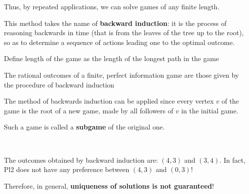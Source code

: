 \documentclass[../main.tex]{subfiles}
\begin{document}
Thus, by repeated applications, we can solve games of any finite length.

This method takes the name of \textbf{backward induction}: it is the process of reasoning backwards in time (that is from the leaves of the tree up to the root), so as to determine a sequence of actions leading one to the optimal outcome.

\begin{definition}
    Define length of the game as the length of the longest path in the game
\end{definition}

\begin{theorem}
    The rational outcomes of a finite, perfect information game are those given by the procedure of backward induction
\end{theorem}

The method of backwards induction can be applied since every vertex $v$ of the game is the root of a new game, made by all followers of $v$ in the initial game.

Such a game is called a \textbf{subgame} of the original one.

\begin{example}\
    \begin{center}
    \end{center}
    The outcomes obtained by backward induction are: $(4, 3)$ and $(3, 4)$. In fact, Pl2 does not have any preference between $(4, 3)$ and $(0, 3)$!

    Therefore, in general, \textbf{uniqueness of solutions is not guaranteed}!
\end{example}
\end{document}
